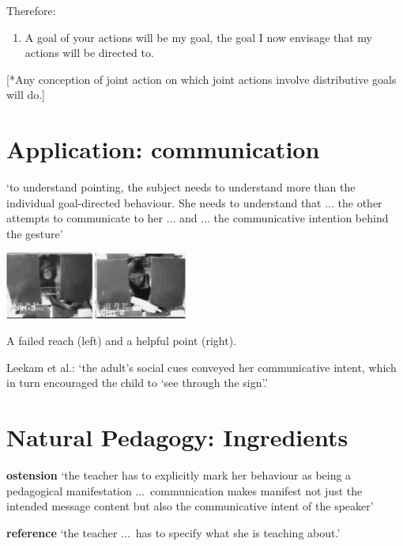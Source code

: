 \documentclass[11pt]{extarticle}
\begin{document}
\begin{multicols}{3}
\begin{enumerate}
\end{enumerate}
%
Therefore:
%
\begin{enumerate}[resume]
%
\item A goal of your actions will be my goal, the goal I now envisage that my actions will be directed to.
\end{enumerate}
%

[*Any conception of joint action on which joint actions involve distributive goals will do.]


\section{Application: communication}

`to understand pointing, the subject needs to understand more than the individual goal-directed behaviour. She needs to understand that ... the other attempts to communicate to her ...  and ... the communicative intention behind the gesture'\citep{Moll:2007gu}


\begin{center}
\includegraphics[width=6cm]{figure_hare_toma_2004_e3.png}
\label{fig:reach_point}

A failed reach (left) and a helpful point (right).\citep%
	{hare_chimpanzees_2004}
\end{center}



Leekam et al.: `the adult’s social cues conveyed her communicative intent, which in turn encouraged the child to `see through the sign'.'
\citep%
{leekam_adults_2010}


\section{Natural Pedagogy: Ingredients}
\textbf{ostension} `the teacher has to explicitly mark her behaviour as being a pedagogical manifestation ...\  communication makes manifest not just the intended message content but also the communicative intent of the speaker’ \citep{Csibra:2005zr} %

\textbf{reference} `the teacher ...\ has to specify what she is teaching about.’ \citep{Csibra:2005zr} %


\end{multicols}
\end{document}
